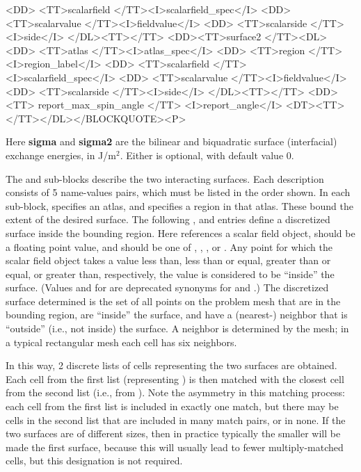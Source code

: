 \begin{description}
\begin{rawhtml}
{{       <DD> <TT>scalarfield </TT><I>scalarfield_spec</I>
       <DD> <TT>scalarvalue </TT><I>fieldvalue</I>
       <DD> <TT>scalarside </TT><I>side</I>
   </DL><TT>}</TT>
   <DD><TT>surface2 {</TT><DL>
       <DD> <TT>atlas </TT><I>atlas_spec</I>
       <DD> <TT>region </TT><I>region_label</I>
       <DD> <TT>scalarfield </TT><I>scalarfield_spec</I>
       <DD> <TT>scalarvalue </TT><I>fieldvalue</I>
       <DD> <TT>scalarside </TT><I>side</I>
   </DL><TT>}</TT>
   <DD><TT> report_max_spin_angle </TT> <I>report_angle</I>
   <DT><TT>}</TT></DL></BLOCKQUOTE><P>
   \end{rawhtml}
   Here \textbf{sigma} and \textbf{sigma2} are the bilinear and
   biquadratic surface (interfacial) exchange energies, in
   J/m${}^2$.  Either is optional, with default value 0.

   The  and  sub-blocks describe
   the two interacting surfaces.  Each description consists of 5
   name-values pairs, which must be listed in the order shown.  In each
   sub-block,  specifies an atlas, and
    specifies a region in that atlas.  These bound
   the extent of the desired surface.  The following
   ,  and
    entries define a discretized surface inside the
   bounding region.  Here  references a scalar
   field object,  should be a floating point value,
   and  should be one of \cd{<}, \cd{<=}, \cd{>=}, or
   \cd{>}.  Any point for which the scalar field object takes a value
   less than, less than or equal, greater than or equal, or greater
   than, respectively, the  value is considered to be
   ``inside'' the surface. (Values \cd{-} and \cd{+} for 
   are deprecated synonyms for \cd{<=} and \cd{>=}.)  The discretized
   surface determined is the set of all points on the problem mesh that
   are in the bounding region, are ``inside'' the surface, and have a
   (nearest-) neighbor that is ``outside'' (i.e., not inside) the
   surface.  A neighbor is determined by the mesh; in a typical
   rectangular mesh each cell has six neighbors.

   In this way, 2 discrete lists of cells representing the two
   surfaces are obtained.  Each cell from the first list (representing
   ) is then matched with the closest cell from the
   second list (i.e., from ).  Note the asymmetry in
   this matching process: each cell from the first list is included in
   exactly one match, but there may be cells in the second list that
   are included in many match pairs, or in none.  If the two surfaces
   are of different sizes, then in practice typically the smaller will
   be made the first surface, because this will usually lead to fewer
   multiply-matched cells, but this designation is not required.


\end{description}
